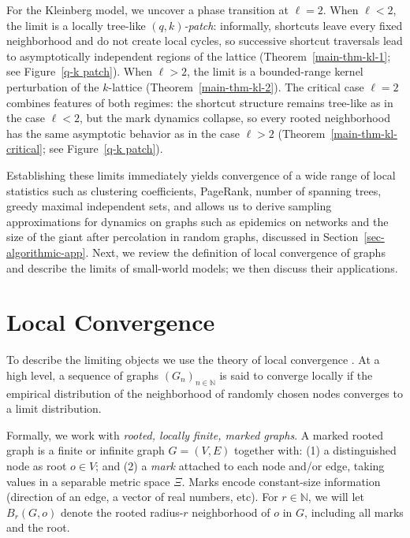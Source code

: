\documentclass[10pt]{amsart}
\begin{document}
For the Kleinberg model, we uncover a phase transition at $\ell=2$.
When $\ell<2$, the limit is a locally tree-like \emph{$(q,k)$-patch}: informally, shortcuts leave every fixed neighborhood and do not create local cycles, so successive shortcut traversals lead to asymptotically independent regions of the lattice (Theorem~\ref{main-thm-kl-1}; see Figure~\ref{q-k patch}).
When $\ell>2$, the limit is a bounded-range kernel perturbation of the $k$-lattice (Theorem~\ref{main-thm-kl-2}).
The critical case $\ell=2$ combines features of both regimes: the shortcut structure remains tree-like as in the case $\ell<2$, but the mark dynamics collapse, so every rooted neighborhood has the same asymptotic behavior as in the case $\ell>2$ (Theorem~\ref{main-thm-kl-critical}; see Figure~\ref{q-k patch}).

Establishing these limits immediately yields convergence of a wide range of local statistics such as clustering coefficients, PageRank, number of spanning trees, greedy maximal independent sets, and allows us to derive sampling approximations for dynamics on graphs such as epidemics on networks and the size of the giant after percolation in random graphs,  discussed in Section~\ref{sec-algorithmic-app}.  
Next, we review the definition of local convergence of graphs and describe the limits of small-world models; we then discuss their applications.

\section{Local Convergence} \label{theory}

To describe the limiting objects we use the theory of local convergence \cite{AldSte04,oded}. At a high level, a sequence of graphs $(G_n)_{n\in\mathbb N}$ is said to converge locally if the empirical distribution of the neighborhood of randomly chosen nodes converges to a limit distribution. %

Formally, we work with \emph{rooted, locally finite, marked graphs}.  A marked rooted graph is a finite or infinite graph $G=(V,E)$ together with:
(1) a distinguished node as root $o\in V$; and
(2) a \emph{mark} attached to each node and/or edge, taking values in a separable metric space $\Xi$.
Marks encode constant-size information (direction of an edge, a vector of real numbers, etc). For $r\in\mathbb{N}$, we will let $B_r(G,o)$ denote the rooted radius-$r$ neighborhood of $o$ in $G$, including all marks and the root.
\end{document}
